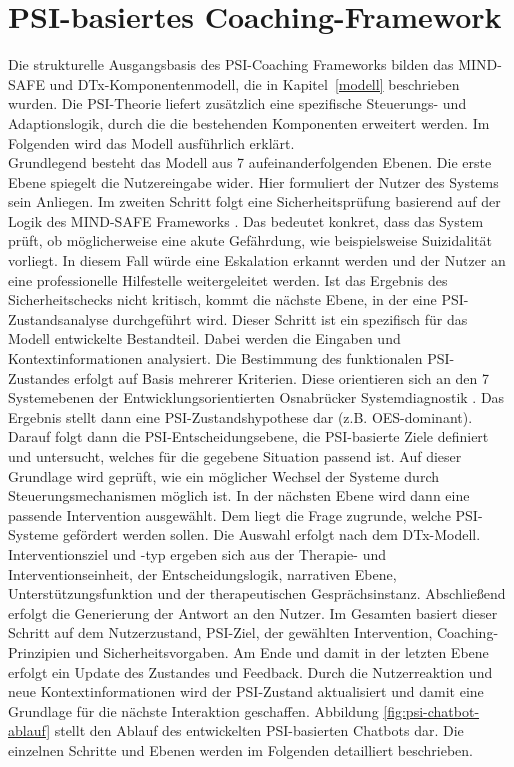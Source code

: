 \section{PSI-basiertes Coaching-Framework}
Die strukturelle Ausgangsbasis des PSI-Coaching Frameworks bilden das MIND-SAFE und DTx-Komponentenmodell, die in Kapitel~\ref{modell} beschrieben wurden. Die PSI-Theorie liefert zusätzlich eine spezifische Steuerungs- und Adaptionslogik, durch die die bestehenden Komponenten erweitert werden. Im Folgenden wird das Modell ausführlich erklärt. \\
Grundlegend besteht das Modell aus 7 aufeinanderfolgenden Ebenen. Die erste Ebene spiegelt die Nutzereingabe wider. Hier formuliert der Nutzer des Systems sein Anliegen. Im zweiten Schritt folgt eine Sicherheitsprüfung basierend auf der Logik des MIND-SAFE Frameworks \citep{boit2025prompt}. Das bedeutet konkret, dass das System prüft, ob möglicherweise eine akute Gefährdung, wie beispielsweise Suizidalität vorliegt. In diesem Fall würde eine Eskalation erkannt werden und der Nutzer an eine professionelle Hilfestelle weitergeleitet werden. Ist das Ergebnis des Sicherheitschecks nicht kritisch, kommt die nächste Ebene, in der eine PSI-Zustandsanalyse durchgeführt wird. Dieser Schritt ist ein spezifisch für das Modell entwickelte Bestandteil. Dabei werden die Eingaben und Kontextinformationen analysiert. Die Bestimmung des funktionalen PSI-Zustandes erfolgt auf Basis mehrerer Kriterien. Diese orientieren sich an den 7 Systemebenen der Entwicklungsorientierten Osnabrücker Systemdiagnostik \citep{kuhl2004systemdiagnostik}. Das Ergebnis stellt dann eine PSI-Zustandshypothese dar (z.B. OES-dominant). Darauf folgt dann die PSI-Entscheidungsebene, die PSI-basierte Ziele definiert und untersucht, welches für die gegebene Situation passend ist. Auf dieser Grundlage wird geprüft, wie ein möglicher Wechsel der Systeme durch Steuerungsmechanismen möglich ist. In der nächsten Ebene wird dann eine passende Intervention ausgewählt. Dem liegt die Frage zugrunde, welche PSI-Systeme gefördert werden sollen. Die Auswahl erfolgt nach dem DTx-Modell. Interventionsziel und -typ ergeben sich aus der Therapie- und Interventionseinheit, der Entscheidungslogik, narrativen Ebene, Unterstützungsfunktion und der therapeutischen Gesprächsinstanz. Abschließend erfolgt die Generierung der Antwort an den Nutzer. Im Gesamten basiert dieser Schritt auf dem Nutzerzustand, PSI-Ziel, der gewählten Intervention, Coaching-Prinzipien und Sicherheitsvorgaben. Am Ende und damit in der letzten Ebene erfolgt ein Update des Zustandes und Feedback. Durch die Nutzerreaktion und neue Kontextinformationen wird der PSI-Zustand aktualisiert und damit eine Grundlage für die nächste Interaktion geschaffen.
Abbildung \ref{fig:psi-chatbot-ablauf} stellt den Ablauf des entwickelten PSI-basierten Chatbots dar. Die einzelnen Schritte und Ebenen werden im Folgenden detailliert beschrieben.

